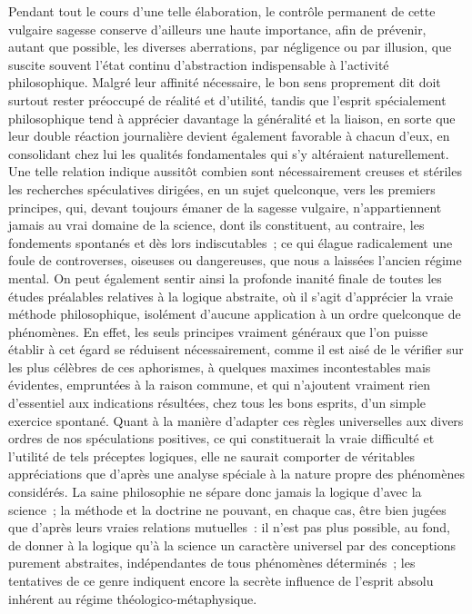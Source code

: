 \documentclass[french,twoside]{book} %
\begin{document}
Pendant tout le cours d’une telle élaboration, le contrôle permanent de cette vulgaire sagesse conserve d’ailleurs une haute importance, afin de prévenir, autant que possible, les diverses aberrations, par négligence ou par illusion, que suscite souvent l’état continu d’abstraction indispensable à l’activité philosophique. Malgré leur affinité nécessaire, le bon sens proprement dit doit surtout rester préoccupé de réalité et d’utilité, tandis que l’esprit spécialement philosophique tend à apprécier davantage la généralité et la liaison, en sorte que leur double réaction journalière devient également favorable à chacun d’eux, en consolidant chez lui les qualités fondamentales qui s’y altéraient naturellement. Une telle relation indique aussitôt combien sont nécessairement creuses et stériles les recherches spéculatives dirigées, en un sujet quelconque, vers les premiers principes, qui, devant toujours émaner de la sagesse vulgaire, n’appartiennent jamais au vrai domaine de la science, dont ils constituent, au contraire, les fondements spontanés et dès lors indiscutables ; ce qui élague radicalement une foule de controverses, oiseuses ou dangereuses, que nous a laissées l’ancien régime mental. On peut également sentir ainsi la profonde inanité finale de toutes les études préalables relatives à la logique abstraite, où il s’agit d’apprécier la vraie méthode philosophique, isolément d’aucune application à un ordre quelconque de phénomènes. En effet, les seuls principes vraiment généraux que l’on puisse établir à cet égard se réduisent nécessairement, comme il est aisé de le vérifier sur les plus célèbres de ces aphorismes, à quelques maximes incontestables mais évidentes, empruntées à la raison commune, et qui n’ajoutent vraiment rien d’essentiel aux indications résultées, chez tous les bons esprits, d’un simple exercice spontané. Quant à la manière d’adapter ces règles universelles aux divers ordres de nos spéculations positives, ce qui constituerait la vraie difficulté et l’utilité de tels préceptes logiques, elle ne saurait comporter de véritables appréciations que d’après une analyse spéciale à la nature propre des phénomènes considérés. La saine philosophie ne sépare donc jamais la logique d’avec la science ; la méthode et la doctrine ne pouvant, en chaque cas, être bien jugées que d’après leurs vraies relations mutuelles : il n’est pas plus possible, au fond, de donner à la logique qu’à la science un caractère universel par des conceptions purement abstraites, indépendantes de tous phénomènes déterminés ; les tentatives de ce genre indiquent encore la secrète influence de l’esprit absolu inhérent au régime théologico-métaphysique.\par
\end{document}
